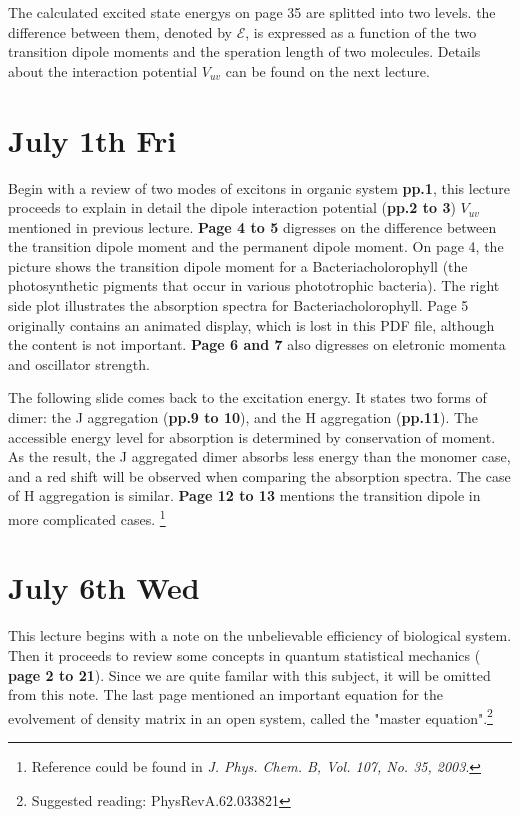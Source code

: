 \documentclass{article}
\numberwithin{equation}{subsection} %
\theoremstyle{definition}
\begin{document}
The calculated excited state energys on page 35 are splitted into
two levels. the difference between them, denoted by $\mathcal{E}$,
is expressed as a function of the two
transition dipole moments and the speration length of two molecules.
Details about the interaction potential $V_{uv}$ can be found on
the next lecture.

\section{July 1th Fri}
\label{sec:July_1th}
Begin with a review of two modes of excitons in organic system
\textbf{pp.1}, this
lecture proceeds to explain in detail the dipole interaction potential
(\textbf{pp.2 to 3})
$V_{uv}$ mentioned in previous lecture. \textbf{Page 4 to 5} digresses on
the difference between the transition dipole moment and the
permanent dipole moment. On page 4, the picture shows the transition dipole
moment for a Bacteriacholorophyll (the photosynthetic pigments that 
occur in various phototrophic bacteria). The right side plot illustrates
the absorption spectra for Bacteriacholorophyll. Page 5 originally
contains an animated display, which is lost in this PDF file, although
the content is not important.
\textbf{Page 6 and 7} also digresses on eletronic momenta and oscillator
strength. 

The following slide comes back to the excitation energy. It states two
forms of dimer: the J aggregation (\textbf{pp.9 to 10}), and the H
aggregation (\textbf{pp.11}). The accessible energy level for absorption
is determined by conservation of moment. As the result, the J aggregated
dimer absorbs less energy than the monomer case, and a red shift will be
observed when comparing the absorption spectra. The case of H aggregation
is similar. \textbf{Page 12 to 13 } mentions the transition dipole in
more complicated cases. \footnote{Reference could be found in \textit{
J. Phys. Chem. B, Vol. 107, No. 35, 2003}.}

\section{July 6th Wed}
\label{sec:July_6th}
This lecture begins with a note on the unbelievable efficiency of biological
system. Then it proceeds to review some concepts in quantum statistical 
mechanics ( \textbf{page 2 to 21}). Since we are quite familar with this
subject, it will be omitted from this note. The last page mentioned an
important equation for the evolvement of density matrix in an open system,
called the "master equation".\footnote{Suggested reading: 
PhysRevA.62.033821}
\end{document}
